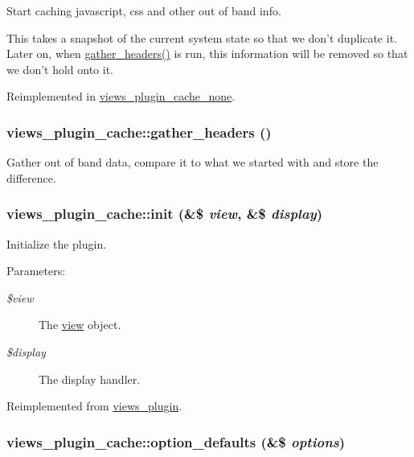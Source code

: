 Start caching javascript, css and other out of band info.

This takes a snapshot of the current system state so that we don't duplicate it. Later on, when \hyperlink{classviews__plugin__cache_557cef7540eec7d0a6ad9cd030724ef7}{gather\_\-headers()} is run, this information will be removed so that we don't hold onto it. 

Reimplemented in \hyperlink{classviews__plugin__cache__none_17f65a53d00a8c51865027c3bce8172a}{views\_\-plugin\_\-cache\_\-none}.\hypertarget{classviews__plugin__cache_557cef7540eec7d0a6ad9cd030724ef7}{
\subsubsection[{gather\_\-headers}]{\setlength{\rightskip}{0pt plus 5cm}views\_\-plugin\_\-cache::gather\_\-headers ()}}
\label{classviews__plugin__cache_557cef7540eec7d0a6ad9cd030724ef7}


Gather out of band data, compare it to what we started with and store the difference. \hypertarget{classviews__plugin__cache_6cecf3993f6314215559c6a914f8a96b}{
\subsubsection[{init}]{\setlength{\rightskip}{0pt plus 5cm}views\_\-plugin\_\-cache::init (\&\$ {\em view}, \/  \&\$ {\em display})}}
\label{classviews__plugin__cache_6cecf3993f6314215559c6a914f8a96b}


Initialize the plugin.

\begin{Desc}
\item[Parameters:]
\begin{description}
\item[{\em \$view}]The \hyperlink{classview}{view} object. \item[{\em \$display}]The display handler. \end{description}
\end{Desc}


Reimplemented from \hyperlink{classviews__plugin_d6545806f1390625286446b426f1a489}{views\_\-plugin}.\hypertarget{classviews__plugin__cache_80e03aac3729dd6c35dbcf817466469e}{
\subsubsection[{option\_\-defaults}]{\setlength{\rightskip}{0pt plus 5cm}views\_\-plugin\_\-cache::option\_\-defaults (\&\$ {\em options})}}
\label{classviews__plugin__cache_80e03aac3729dd6c35dbcf817466469e}


